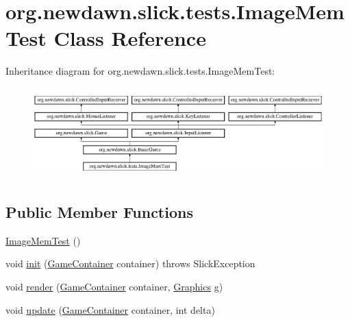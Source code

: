 \hypertarget{classorg_1_1newdawn_1_1slick_1_1tests_1_1_image_mem_test}{}\section{org.\+newdawn.\+slick.\+tests.\+Image\+Mem\+Test Class Reference}
\label{classorg_1_1newdawn_1_1slick_1_1tests_1_1_image_mem_test}
Inheritance diagram for org.\+newdawn.\+slick.\+tests.\+Image\+Mem\+Test\+:\begin{figure}[H]
\begin{center}
\leavevmode
\includegraphics[height=3.522012cm]{classorg_1_1newdawn_1_1slick_1_1tests_1_1_image_mem_test}
\end{center}
\end{figure}
\subsection*{Public Member Functions}
\begin{DoxyCompactItemize}
\item 
\mbox{\hyperlink{classorg_1_1newdawn_1_1slick_1_1tests_1_1_image_mem_test_a8fd5f0fae6b302ef04b1f1af1176dbb1}{Image\+Mem\+Test}} ()
\item 
void \mbox{\hyperlink{classorg_1_1newdawn_1_1slick_1_1tests_1_1_image_mem_test_ab1c711f13e9306b417fed9d190bf04f4}{init}} (\mbox{\hyperlink{classorg_1_1newdawn_1_1slick_1_1_game_container}{Game\+Container}} container)  throws Slick\+Exception 
\item 
void \mbox{\hyperlink{classorg_1_1newdawn_1_1slick_1_1tests_1_1_image_mem_test_a9ad05ee3e18b0cf40911c877d3ac673e}{render}} (\mbox{\hyperlink{classorg_1_1newdawn_1_1slick_1_1_game_container}{Game\+Container}} container, \mbox{\hyperlink{classorg_1_1newdawn_1_1slick_1_1_graphics}{Graphics}} g)
\item 
void \mbox{\hyperlink{classorg_1_1newdawn_1_1slick_1_1tests_1_1_image_mem_test_a90e3269c81066560825d9be380d3a4d0}{update}} (\mbox{\hyperlink{classorg_1_1newdawn_1_1slick_1_1_game_container}{Game\+Container}} container, int delta)
\end{DoxyCompactItemize}

